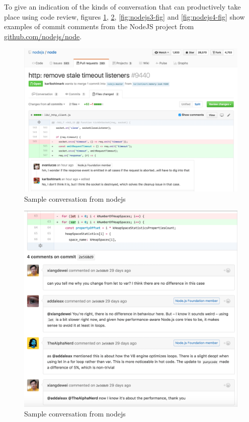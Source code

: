 \documentclass[
]{book}
\begin{document}
To give an indication of the kinds of conversation that can productively take place using code review, figures \ref{fig:nodejs1-fig}, \ref{fig:nodejs2-fig}, \ref{fig:nodejs3-fig} and \ref{fig:nodejs4-fig} show examples of commit comments from the NodeJS project from \href{https://github.com/nodejs/node}{github.com/nodejs/node}.

\begin{figure}

{\centering \includegraphics[width=1\linewidth]{images/nodejs1} 

}

\caption{Sample conversation from nodejs}\label{fig:nodejs1-fig}
\end{figure}
\begin{figure}

{\centering \includegraphics[width=1\linewidth]{images/nodejs2} 

}

\caption{Sample conversation from nodejs}\label{fig:nodejs2-fig}
\end{figure}
\end{document}
